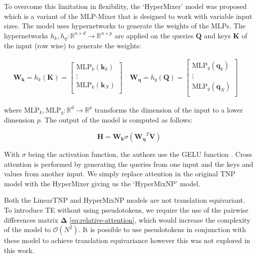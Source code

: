\documentclass[../../main.tex]{subfiles}
\begin{document}
To overcome this limitation in flexibility, the `HyperMixer' \cite{mai2023hypermixer} model was proposed which is a variant of the MLP-Mixer that is designed to work with variable input sizes. The model uses hypernetworks \cite{ha2016hypernetworks} to generate the weights of the MLPs. The hypernetworks $h_k, h_q : \mathbb{R}^{n \times d} \rightarrow \mathbb{R}^{n \times p}$ are applied on the queries $\bm{Q}$ and keys $\bm{K}$ of the input (row wise) to generate the weights:

\begin{align}
    \bm{W_k} = h_k(\bm{K}) =  \begin{bmatrix}
        \text{MLP}_k(\bm{k}_k) \\
        \vdots \\
        \text{MLP}_k(\bm{k}_N) \\
    \end{bmatrix} \quad
    \bm{W_q} = h_q(\bm{Q}) =  \begin{bmatrix}
        \text{MLP}_q(\bm{q}_k) \\
        \vdots \\
        \text{MLP}_q(\bm{q}_N) \\
    \end{bmatrix} \quad
\end{align}

where $\text{MLP}_k, \text{MLP}_q: \mathbb{R}^d \rightarrow \mathbb{R}^p$ transforms the dimension of the input to a lower dimension $p$. The output of the model is computed as follows:

\begin{equation}
    \bm{H} = \bm{W_k} \sigma(\bm{W_q}^T \bm{V})
\end{equation}

With $\sigma$ being the activation function, the authors use the GELU function \cite{hendrycks2023gaussian}.
Cross attention is performed by generating the queries from one input and the keys and values from another input. We simply replace attention in the original TNP model with the HyperMixer giving us the `HyperMixNP' model. 

\begin{note}
    Both the LinearTNP and HyperMixNP models are not translation equivariant. To introduce TE without using pseudotokens, we require the use of the pairwise differences matrix $\bm{\Delta}$ \autoref{eq:relative-attention}, which would increase the complexity of the model to $\mathcal{O}(N^2)$. It is possible to use pseudotokens in conjunction with these model to achieve translation equivariance however this was not explored in this work.
\end{note}
\end{document}
